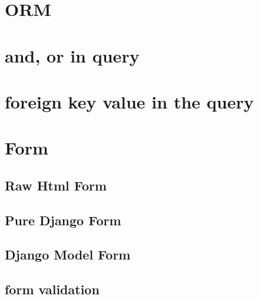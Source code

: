 \documentclass{article}
\begin{document}
	\section{ORM}
		\section{and, or in query}
		\section{foreign key value in the query}
	\section{Form} 
		\subsection{Raw Html Form}
		\subsection{Pure Django Form}
		\subsection{Django Model Form}
		\subsection{form validation}
		
%	
%	
	
\end{document}
